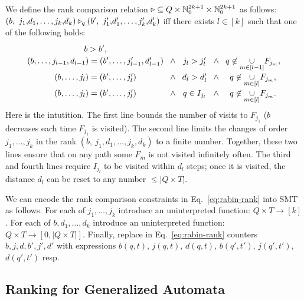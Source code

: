 We define the rank comparison relation
$\triangleright \subseteq Q \times \mathbb{N}_0^{2k+1} \times \mathbb{N}_0^{2k+1}$
as follows:
$(b, ~j_1,\!d_1, \dots , j_k,\!d_k) \triangleright_q (b', ~j'_1,\!d'_1, \dots , j'_k,\!d'_k)$
iff
there exists $l \in [k]$ such that one of the following holds:
\begin{equation}\label{eq:rabin-rank}
\arraycolsep=4pt\def\arraystretch{1.2}
\begin{array}{ccccc}
b > b', &  & & &  \\
(b,\dots,j_{l-1},d_{l-1}) = (b',\dots,j'_{l-1},d'_{l-1})  &\land & j_l > j_l'&\land&  q \not\in \underset{m\in [l-1]}{\cup} F_{j_m},   \\
(b,\dots ,j_l) = (b',\dots, j'_l)  &\land & d_l > d_l' & \land & q \not\in \underset{m\in[l]}{\cup} F_{j_m},    \\
(b,\dots, j_l) = (b',\dots, j'_l)  &\land & q \in I_{j_l} &\land &  q \not\in \underset{m\in[l]}{\cup} F_{j_m}.
\end{array}
\end{equation}
Here is the intutition.
The first line bounds the number of visits to $F_{j_1}$
($b$ decreases each time $F_{j_1}$ is visited).
The second line limits the changes of order $j_1,\dots ,j_k$
in the rank $(b,~j_1,d_1,\dots ,j_k,d_k)$ to a finite number.
Together, these two lines ensure that on any path some $F_m$
is not visited infinitely often.
The third and fourth lines require $I_{j_l}$ to be visited within $d_l$ steps;
once it is visited, the distance $d_l$ can be reset to any number
$\leq |Q\times T|$.

We can encode the rank comparison constraints in Eq.~\ref{eq:rabin-rank} into SMT as follows.
For each of $j_1,\dots,j_k$ introduce an uninterpreted function:
$Q\times T \to [k]$.
For each of $b,d_1,\dots,d_k$ introduce an uninterpreted function:
$Q\times T \to [0,|Q\times T|]$.
Finally, replace in Eq.~\ref{eq:rabin-rank} counters $b,j,d,b',j',d'$ with
expressions $b(q,t)$, $j(q,t)$, $d(q,t)$, $b(q',t')$, $j(q',t')$, $d(q',t')$ resp.


\subsection*{Ranking for Generalized Automata}

